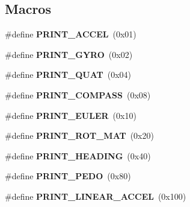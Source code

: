 \subsection*{Macros}
\begin{DoxyCompactItemize}
\item 
\hypertarget{group__e_m_p_l_ga83c044582a9fec2e45f8858efa5885b8}{}\#define {\bfseries P\+R\+I\+N\+T\+\_\+\+A\+C\+C\+E\+L}~(0x01)\label{group__e_m_p_l_ga83c044582a9fec2e45f8858efa5885b8}

\item 
\hypertarget{group__e_m_p_l_ga1f7cea00edafdbe1570199b28042ddd3}{}\#define {\bfseries P\+R\+I\+N\+T\+\_\+\+G\+Y\+R\+O}~(0x02)\label{group__e_m_p_l_ga1f7cea00edafdbe1570199b28042ddd3}

\item 
\hypertarget{group__e_m_p_l_ga709f1d5781d96858850143298f88104c}{}\#define {\bfseries P\+R\+I\+N\+T\+\_\+\+Q\+U\+A\+T}~(0x04)\label{group__e_m_p_l_ga709f1d5781d96858850143298f88104c}

\item 
\hypertarget{group__e_m_p_l_gae55039e3cf38b78e1ec327c3e81d2859}{}\#define {\bfseries P\+R\+I\+N\+T\+\_\+\+C\+O\+M\+P\+A\+S\+S}~(0x08)\label{group__e_m_p_l_gae55039e3cf38b78e1ec327c3e81d2859}

\item 
\hypertarget{group__e_m_p_l_gabfb66b3aafb997de9897c558dfc34b8e}{}\#define {\bfseries P\+R\+I\+N\+T\+\_\+\+E\+U\+L\+E\+R}~(0x10)\label{group__e_m_p_l_gabfb66b3aafb997de9897c558dfc34b8e}

\item 
\hypertarget{group__e_m_p_l_ga83fe59ee63a2dd6ba73760f07a21ee95}{}\#define {\bfseries P\+R\+I\+N\+T\+\_\+\+R\+O\+T\+\_\+\+M\+A\+T}~(0x20)\label{group__e_m_p_l_ga83fe59ee63a2dd6ba73760f07a21ee95}

\item 
\hypertarget{group__e_m_p_l_ga39965157fdb18499d2665cdb203971dd}{}\#define {\bfseries P\+R\+I\+N\+T\+\_\+\+H\+E\+A\+D\+I\+N\+G}~(0x40)\label{group__e_m_p_l_ga39965157fdb18499d2665cdb203971dd}

\item 
\hypertarget{group__e_m_p_l_gafc50e337bac90191d386f47e3cf49a7d}{}\#define {\bfseries P\+R\+I\+N\+T\+\_\+\+P\+E\+D\+O}~(0x80)\label{group__e_m_p_l_gafc50e337bac90191d386f47e3cf49a7d}

\item 
\hypertarget{group__e_m_p_l_ga247e0609bfe123b5d988f0c63e99bf76}{}\#define {\bfseries P\+R\+I\+N\+T\+\_\+\+L\+I\+N\+E\+A\+R\+\_\+\+A\+C\+C\+E\+L}~(0x100)\label{group__e_m_p_l_ga247e0609bfe123b5d988f0c63e99bf76}


\end{DoxyCompactItemize}
